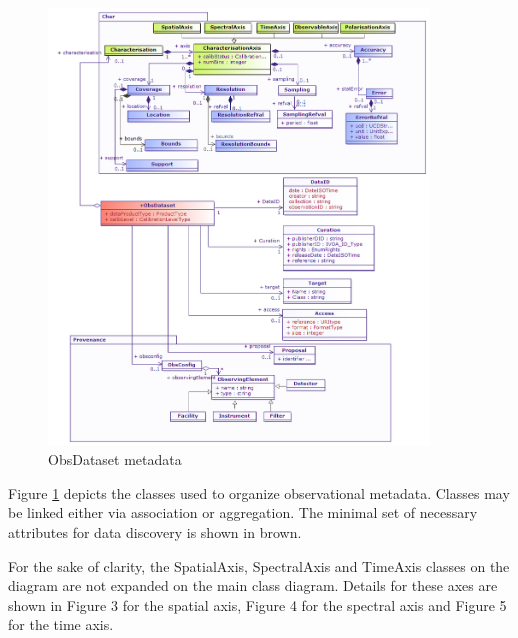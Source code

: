 \documentclass[11pt,a4paper]{ivoa}
\begin{document}
\begin{figure}[H]
\centering
\includegraphics[width=0.9\textwidth]{ObsDataset.png}
\caption{ObsDataset metadata}
\label{fig:obsdataset}
\end{figure}
Figure \ref{fig:obsdataset} depicts the classes used to organize observational metadata. Classes may be linked either via 
association or aggregation.  The minimal set of necessary attributes for data discovery is shown in brown.

For the sake of clarity, the SpatialAxis, SpectralAxis and TimeAxis classes on the diagram are not expanded on the main
class diagram. Details for these axes are shown in Figure 3 for the spatial axis, Figure 4 for the spectral axis and
Figure 5 for the time axis.
\end{document}
